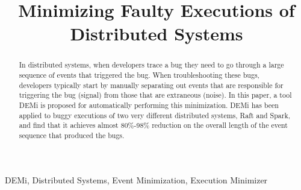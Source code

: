 \documentclass[10pt, conference, compsocconf]{IEEEtran}
\begin{document}
\title{Minimizing Faulty Executions of Distributed Systems}

\author{


}

\maketitle
\thispagestyle{plain}
\pagestyle{plain}

\begin{abstract}
In distributed systems, when developers trace a bug they need to go through a large sequence of events that triggered the bug. When troubleshooting these bugs, developers typically start by manually separating out events that are responsible for triggering the bug (signal) from those that are extraneous (noise). In this paper, a tool DEMi is proposed for automatically performing this minimization. DEMi has been applied to buggy executions of two
very different distributed systems, Raft and Spark, and find that it achieves almost 80\%-98\% reduction on the overall length of the event sequence that produced the bugs.


\end{abstract}

\begin{IEEEkeywords}
DEMi, Distributed Systems, Event Minimization, Execution Minimizer

\end{IEEEkeywords}


%
\IEEEpeerreviewmaketitle



%
%
%




\end{document}
